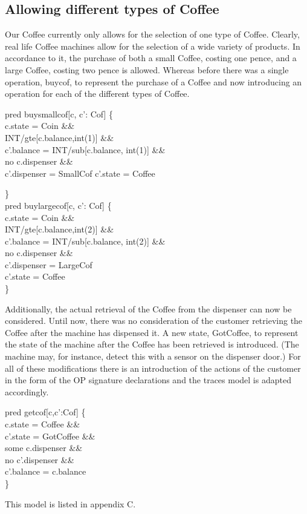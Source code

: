 \documentclass[a4paper,12pt]{extarticle}
\begin{document}
\subsection{Allowing different types of Coffee}
\label{Different Coffees}
Our Coffee currently only allows for the selection of one type of Coffee. Clearly, real life Coffee machines allow for the selection of a wide variety of products. In accordance to it, the purchase of both a small Coffee, costing one pence, and a large Coffee, costing two pence is allowed. Whereas before there was a single operation, buycof, to represent the purchase of a Coffee and now introducing an operation for each of the different types of Coffee.\\
\begin{algorithm}
pred buysmallcof[c, c': Cof] \{ \\

c.state = Coin \&\& \\
INT/gte[c.balance,int(1)] \&\& \\
c'.balance = INT/sub[c.balance, int(1)] \&\& \\
no c.dispenser \&\& \\
c'.dispenser = SmallCof
c'.state = Coffee

\}\\


pred buylargecof[c, c': Cof] \{ \\

c.state = Coin \&\& \\
INT/gte[c.balance,int(2)] \&\& \\
c'.balance = INT/sub[c.balance, int(2)] \&\& \\
no c.dispenser \&\& \\
c'.dispenser = LargeCof\\
c'.state = Coffee\\

\}\\
\end{algorithm}
Additionally, the actual retrieval of the Coffee from the dispenser can now be considered. Until now, there was no consideration of the customer retrieving the Coffee after the machine has dispensed it. A new state, GotCoffee, to represent the state of the machine after the Coffee has been retrieved is introduced. (The machine may, for instance, detect this with a sensor on the dispenser door.) For all of these modifications there is an introduction of the actions of the customer in the form of the OP signature declarations and the traces model is adapted accordingly.
\begin{algorithm}
pred getcof[c,c':Cof] \{ \\

c.state = Coffee \&\& \\
c'.state = GotCoffee \&\& \\
some c.dispenser \&\& \\
no c'.dispenser \&\& \\
c'.balance = c.balance\\

\}\\
\end{algorithm}
This model is listed in appendix C.
\end{document}
